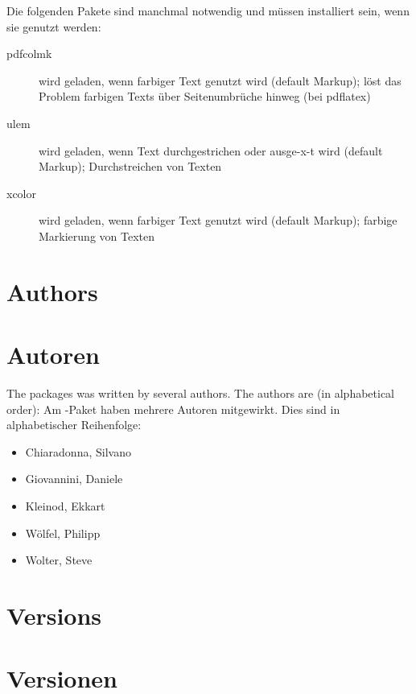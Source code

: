 		Die folgenden Pakete sind manchmal notwendig und müssen installiert sein, wenn sie genutzt werden:
		\begin{description}
			\item [pdfcolmk] wird geladen, wenn farbiger Text genutzt wird (default Markup); löst das Problem farbigen Texts über Seitenumbrüche hinweg (bei pdflatex)
			\item [ulem] wird geladen, wenn Text durchgestrichen oder ausge-x-t wird (default Markup); Durchstreichen von Texten
			\item [xcolor] wird geladen, wenn farbiger Text genutzt wird (default Markup); farbige Markierung von Texten
		\end{description}
	\fi


\ifENGLISH
	\section{Authors}
\fi
	\ifGERMAN
		\section{Autoren}
	\fi
\label{sec:authors}

\ifENGLISH
	The  packages was written by several authors.
	The authors are (in alphabetical order):
\fi
	\ifGERMAN
		Am -Paket haben mehrere Autoren mitgewirkt.
		Dies sind in alphabetischer Reihenfolge:
	\fi
\begin{itemize}
	\item Chiaradonna, Silvano
	\item Giovannini, Daniele
	\item Kleinod, Ekkart
	\item Wölfel, Philipp
	\item Wolter, Steve
\end{itemize}



\ifENGLISH
	\section{Versions}
\fi
	\ifGERMAN
		\section{Versionen}
	\fi
\label{sec:versions}

